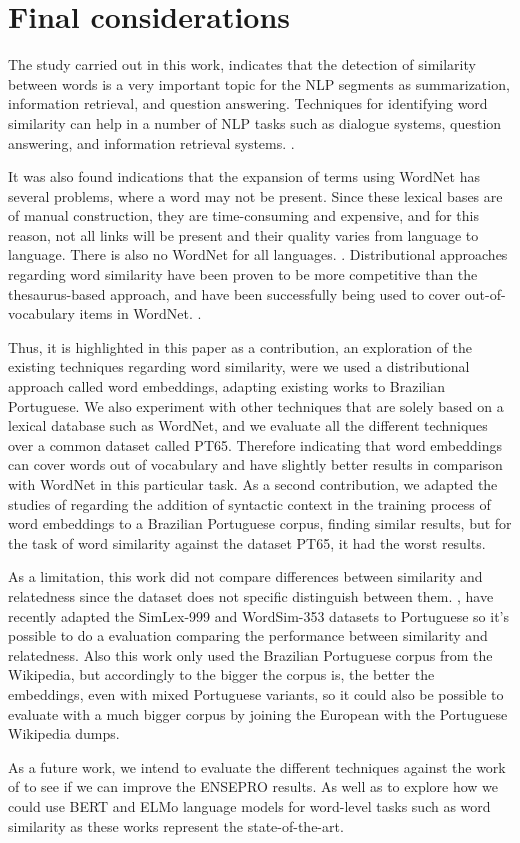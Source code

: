 \section{Final considerations}\label{chap:conclusions}

The study carried out in this work, indicates that the detection of similarity between words is a very important topic for the NLP segments as summarization, information retrieval, and question answering. Techniques for identifying word similarity can help in a number of NLP tasks such as dialogue systems, question answering, and information retrieval systems. \cite{Islam2007ApplicationsOC,Pilehvar2013,Agirre2009}.

It was also found indications that the expansion of terms using WordNet has several problems, where a word may not be present. Since these lexical bases are of manual construction, they are time-consuming and expensive, and for this reason, not all links will be present and their quality varies from language to language.  There is also no WordNet for all languages. \cite{Leeuwenberga2016}. Distributional approaches regarding word similarity have been proven to be more competitive than the thesaurus-based approach, and have been successfully being used to cover out-of-vocabulary items in WordNet.  \cite{gonccalo2018distributional, Agirre2009}.

Thus, it is highlighted in this paper as a contribution, an exploration of the existing techniques regarding word similarity, were we used a distributional approach called word embeddings, adapting existing works to Brazilian Portuguese. We also experiment with other techniques that are solely based on a lexical database such as WordNet, and we evaluate all the different techniques over a common dataset called PT65. Therefore indicating that word embeddings can cover words out of vocabulary and have slightly better results in comparison with WordNet in this particular task. As a second contribution, we adapted the studies of  regarding the addition of syntactic context in the training process of word embeddings to a Brazilian Portuguese corpus, finding similar results, but for the task of word similarity against the dataset PT65, it had the worst results.

As a limitation, this work did not compare differences between similarity and relatedness since the dataset does not specific distinguish between them. , have recently adapted the SimLex-999 and WordSim-353 datasets to Portuguese so it's possible to do a evaluation comparing the performance between similarity and relatedness. Also this work only used the Brazilian Portuguese corpus from the Wikipedia, but accordingly to  the bigger the corpus is, the better the embeddings, even with mixed Portuguese variants, so it could also be possible to evaluate with a much bigger corpus by joining the European with the Portuguese Wikipedia dumps.

As a future work, we intend to evaluate the different techniques against the work of  to see if we can improve the ENSEPRO results. As well as to explore how we could use BERT and ELMo language models for word-level tasks such as word similarity as these works represent the state-of-the-art.